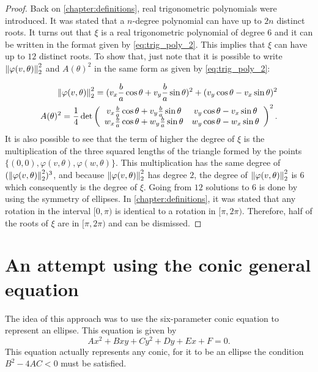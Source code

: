 \begin{proof}
	
Back on \autoref{chapter:definitions}, real trigonometric polynomials were introduced. It was stated that a $n$-degree polynomial can have up to $2n$ distinct roots. It turns out that $\xi$ is a real trigonometric polynomial of degree $6$ and it can be written in the format given by \autoref{eq:trig_poly_2}. This implies that $\xi$ can have up to $12$ distinct roots.
 To show that, just note that it is possible to write $\left\lVert\varphi(v, \theta)\right\rVert_{2}^2$ and $A(\theta)^2$ in the same form as given by \autoref{eq:trig_poly_2}:
 
 \begin{align}\label{eq:dd}
 	\left\lVert\varphi(v, \theta)\right\rVert_{2}^2 = (v_x\frac{b}{a}\cos\theta + v_y\frac{b}{a}\sin\theta)^2 + (v_y\cos\theta - v_x\sin\theta)^2\\
 	\label{eq:dd2} A(\theta)^2=\dfrac{1}{4}\det\left(
 	\begin{array}{cc}
 		v_x\frac{b}{a}\cos\theta + v_y\frac{b}{a}\sin\theta&v_y\cos\theta - v_x\sin\theta\\
 		w_x\frac{b}{a}\cos\theta + w_y\frac{b}{a}\sin\theta&w_y\cos\theta - w_x\sin\theta
 	\end{array}\right)^2.
 \end{align}
  It is also possible to see that the term of higher the degree of $\xi$ is the multiplication of the three squared lengths of the triangle formed by the points $\{(0, 0), \varphi(v, \theta), \varphi(w, \theta)\}$. This multiplication has the same degree of $(\left\lVert\varphi(v, \theta)\right\rVert_{2}^2)^3$, and because $\left\lVert\varphi(v, \theta)\right\rVert_{2}^2$ has degree $2$, the degree of $\left\lVert\varphi(v, \theta)\right\rVert_{2}^2$ is $6$ which consequently is the degree of $\xi$.
Going from $12$ solutions to $6$ is done by using the symmetry of ellipses. In \autoref{chapter:definitions}, it was stated that any rotation in the interval $[0, \pi)$ is identical to a rotation in $[\pi, 2\pi)$. Therefore, half of the roots of $\xi$ are in $[\pi, 2\pi)$ and can be dismissed.
\end{proof}

\section{An attempt using the conic general equation}

The idea of this approach was to use the six-parameter conic equation to represent an ellipse. This equation is given by
\begin{equation}\label{eq:gen_ellipse}
Ax^2+Bxy+Cy^2+Dy+Ex+F=0.
\end{equation}
This equation actually represents any conic, for it to be an ellipse the condition $B^2 -4AC < 0$ must be satisfied.

